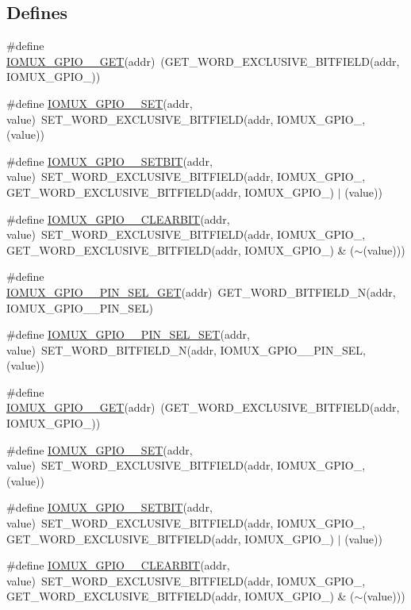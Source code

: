 \subsection*{Defines}
\begin{DoxyCompactItemize}
\item 
\#define \hyperlink{a00559_a82f10474648e82ec8f4b1140fb10ccda}{IOMUX\_\-GPIO\_\_\-GET}(addr)~(GET\_\-WORD\_\-EXCLUSIVE\_\-BITFIELD(addr, IOMUX\_\-GPIO\_))
\item 
\#define \hyperlink{a00559_a29196863a719e7b3de267f8e17f639b9}{IOMUX\_\-GPIO\_\_\-SET}(addr, value)~SET\_\-WORD\_\-EXCLUSIVE\_\-BITFIELD(addr, IOMUX\_\-GPIO\_, (value))
\item 
\#define \hyperlink{a00559_a37e85aec20dca6d59d97185142429ec2}{IOMUX\_\-GPIO\_\_\-SETBIT}(addr, value)~SET\_\-WORD\_\-EXCLUSIVE\_\-BITFIELD(addr, IOMUX\_\-GPIO\_, GET\_\-WORD\_\-EXCLUSIVE\_\-BITFIELD(addr, IOMUX\_\-GPIO\_) $|$ (value))
\item 
\#define \hyperlink{a00559_acbbf8fb33f8f2cce2f12992108282625}{IOMUX\_\-GPIO\_\_\-CLEARBIT}(addr, value)~SET\_\-WORD\_\-EXCLUSIVE\_\-BITFIELD(addr, IOMUX\_\-GPIO\_, GET\_\-WORD\_\-EXCLUSIVE\_\-BITFIELD(addr, IOMUX\_\-GPIO\_) \& ($\sim$(value)))
\item 
\#define \hyperlink{a00559_a883a3d3a9427ed9ede9a92a87e3b5fe2}{IOMUX\_\-GPIO\_\_\-PIN\_\-SEL\_\-GET}(addr)~GET\_\-WORD\_\-BITFIELD\_\-N(addr, IOMUX\_\-GPIO\_\_\-PIN\_\-SEL)
\item 
\#define \hyperlink{a00559_a7ddcea29c400694091a17095bd7f576b}{IOMUX\_\-GPIO\_\_\-PIN\_\-SEL\_\-SET}(addr, value)~SET\_\-WORD\_\-BITFIELD\_\-N(addr, IOMUX\_\-GPIO\_\_\-PIN\_\-SEL, (value))
\item 
\#define \hyperlink{a00559_ac9a5d523eee13d620ace1d9b91d85c4b}{IOMUX\_\-GPIO\_\_\-GET}(addr)~(GET\_\-WORD\_\-EXCLUSIVE\_\-BITFIELD(addr, IOMUX\_\-GPIO\_))
\item 
\#define \hyperlink{a00559_aa8c2c50184ac76a4fcf96184babc86ab}{IOMUX\_\-GPIO\_\_\-SET}(addr, value)~SET\_\-WORD\_\-EXCLUSIVE\_\-BITFIELD(addr, IOMUX\_\-GPIO\_, (value))
\item 
\#define \hyperlink{a00559_a36594c24fb9a48d98d4d2c15f61bbb9a}{IOMUX\_\-GPIO\_\_\-SETBIT}(addr, value)~SET\_\-WORD\_\-EXCLUSIVE\_\-BITFIELD(addr, IOMUX\_\-GPIO\_, GET\_\-WORD\_\-EXCLUSIVE\_\-BITFIELD(addr, IOMUX\_\-GPIO\_) $|$ (value))
\item 
\#define \hyperlink{a00559_a4393afc5fb281dad33b7a38130007943}{IOMUX\_\-GPIO\_\_\-CLEARBIT}(addr, value)~SET\_\-WORD\_\-EXCLUSIVE\_\-BITFIELD(addr, IOMUX\_\-GPIO\_, GET\_\-WORD\_\-EXCLUSIVE\_\-BITFIELD(addr, IOMUX\_\-GPIO\_) \& ($\sim$(value)))

\end{DoxyCompactItemize}

